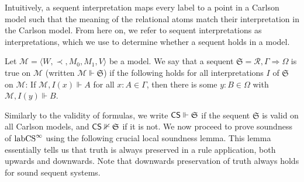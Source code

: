 \documentclass[runningheads,orivec]{llncs}
\newcommand{\CS}{\textnormal{\textsf{CS}}}
\newcommand{\labCS}{{\textnormal{labCS}^\infty}}
\newcommand{\Ra}{\Rightarrow}
\newcommand{\la}{\langle}
\newcommand{\ra}{\rangle}
\newcommand{\R}{\mathcal{R}}
\newcommand{\Mw}{\mathcal{M}}
\newcommand{\Seq}{\mathfrak{S}}
\begin{document}
Intuitively, a sequent interpretation maps every label to a point in a Carlson model such that the meaning of the relational atoms match their interpretation in the Carlson model. 
From here on, we refer to sequent interpretations as interpretations, which we use to determine whether a sequent holds in a model.

\begin{definition}
     Let $\Mw = \la W , \prec, M_0 , M_1 , V \ra$ be a model. We say that a sequent $\Seq = \R , \Gamma \Ra \Omega$ is true on $\Mw$ (written $\Mw \Vdash \Seq$) if the following holds for all interpretations $I $ of $\Seq$ on $\Mw$:
     If $\Mw , I(x) \Vdash A$ for all $x : A \in \Gamma$, then there is some $y : B \in \Omega$ with $\Mw, I(y) \Vdash B$.
\end{definition}

Similarly to the validity of formulas, we write $\CS \Vdash \Seq$ if the sequent $\Seq$ is valid on all Carlson models, and $\CS \nVdash \Seq$ if it is not. 
We now proceed to prove soundness of $\labCS$ using the following crucial local soundness lemma. This lemma essentially tells us that truth is always preserved in a rule application, both upwards and downwards. Note that downwards preservation of truth always holds for sound sequent systems.
\end{document}
